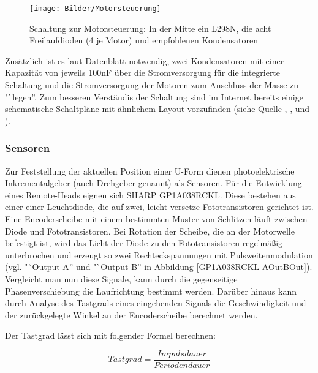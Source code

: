 \documentclass[a4paper, 12pt, bibliography=totocnumbered, listof=numbered]{scrartcl}
\begin{document}
	\begin{figure}[htb]
		\centering
		\texttt{[image: Bilder/Motorsteuerung]}
		\caption{Schaltung zur Motorsteuerung: In der Mitte ein L298N, die acht Freilaufdioden (4 je Motor) und empfohlenen Kondensatoren}
	\end{figure}

	Zusätzlich ist es laut Datenblatt\cite{l298} notwendig, zwei Kondensatoren mit einer Kapazität von jeweils 100nF über die Stromversorgung für die integrierte Schaltung und die Stromversorgung der Motoren zum Anschluss der Masse zu "`legen''.
	Zum besseren Verständis der Schaltung sind im Internet bereits einige schematische Schaltpläne mit ähnlichem Layout vorzufinden (siehe Quelle \cite{arduino-motor}, \cite{rn-steuerung}, \cite{motordriver} und \cite{l298-schaltung}).

	\subsubsection{Sensoren}
	Zur Feststellung der aktuellen Position einer U-Form dienen photoelektrische Inkrementalgeber (auch Drehgeber genannt) als Sensoren. Für die Entwicklung eines Remote-Heads eignen sich SHARP GP1A038RCKL\cite{inkrementalgeber}. Diese bestehen aus einer einer Leuchtdiode, die auf zwei, leicht versetze Fototransistoren gerichtet ist. Eine Encoderscheibe mit einem bestimmten Muster von Schlitzen läuft zwischen Diode und Fototransistoren. Bei Rotation der Scheibe, die an der Motorwelle befestigt ist, wird das Licht der Diode zu den Fototransistoren regelmäßig unterbrochen und erzeugt so zwei Rechteckspannungen mit Pulsweitenmodulation (vgl. "`Output A'' und "`Output B'' in Abbildung \ref{GP1A038RCKL-AOutBOut}). Vergleicht man nun diese Signale, kann durch die gegenseitige Phasenverschiebung die Laufrichtung bestimmt werden. Darüber hinaus kann durch Analyse des Tastgrads\cite{wikipedia-tastgrad} eines eingehenden Signals die Geschwindigkeit und der zurückgelegte Winkel an der Encoderscheibe berechnet werden.

	Der Tastgrad lässt sich mit folgender Formel berechnen:

	\begin{equation}
		Tastgrad = \frac{Impulsdauer}{Periodendauer}
	\end{equation}
\end{document}
